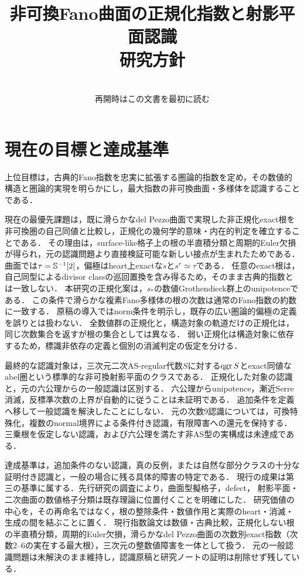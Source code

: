 \documentclass[11pt,a4paper]{ltjsarticle}
\title{非可換Fano曲面の正規化指数と射影平面認識\\研究方針}
\author{}
\date{\versiondate\\再開時はこの文書を最初に読む}
\begin{document}
\maketitle

\section{現在の目標と達成基準}
上位目標は，古典的Fano指数を忠実に拡張する圏論的指数を定め，その数値的構造と圏論的実現を明らかにし，最大指数の非可換曲面・多様体を認識することである．\par
現在の最優先課題は，既に滑らかなdel Pezzo曲面で実現した非正規化exact根を非可換圏の自己同値と比較し，正規化の幾何学的意味・内在的判定を確立することである．
その理由は，surface-like格子上の根の半直積分類と周期的Euler欠損が得られ，元の認識問題より直接検証可能な新しい接点が生まれたためである．
曲面では$\tau=\mathbb S^{-1}[2]$，偏極はheart上exactな$s$と$s^r\simeq\tau$である．
任意のexact根は，自己同型によるdivisor classの巡回置換を含み得るため，そのまま古典的指数とは一致しない．
本研究の正規化案は，$s_*$の数値Grothendieck群上のunipotenceである．
この条件で滑らかな複素Fano多様体の根の次数は通常のFano指数の約数に一致する．
原稿の導入ではnorm条件を明示し，既存の広い圏論的偏極の定義を誤りとは扱わない．
全数値群の正規化と，構造対象の軌道だけの正規化は，同じ次数集合を返すが根の集合としては異なる．
弱い正規化は構造対象に依存するため，標識非依存の定義と個別の消滅判定の仮定を分ける．

最終的な認識対象は，三次元二次AS-regular代数$S$に対する$\operatorname{qgr} S$とexact同値なabel圏という標準的な非可換射影平面のクラスである．
正規化した対象の認識と，元の六公理からの一般認識は区別する．
六公理からunipotence，漸近Serre消滅，反標準次数の上界が自動的に従うことは未証明である．
追加条件を定義へ移して一般認識を解決したことにしない．
元の次数9認識については，可換特殊化，複数のnormal境界による条件付き認識，有限障害への還元を保持する．
三乗根を仮定しない認識，および六公理を満たす非AS型の実構成は未達成である．

達成基準は，追加条件のない認識，真の反例，または自然な部分クラスの十分な証明付き認識と，一般の場合に残る具体的障害の特定である．
現行の成果は第三の基準に属する．先行研究の調査により，曲面型擬格子，defect，
射影平面・二次曲面の数値格子分類は既存理論に位置付くことを明確にした．
研究価値の中心を，その再命名ではなく，根の整除条件・数値作用と実際のheart・消滅・生成の間を結ぶことに置く．
現行指数論文は数値・古典比較，正規化しない根の半直積分類，周期的Euler欠損，滑らかなdel Pezzo曲面の次数別exact指数（次数2--6の実在する最大根），三次元の整数値障害を一体として扱う．
元の一般認識問題は未解決のまま維持し，認識原稿と研究ノートの証明は削除せず残している．
\end{document}
